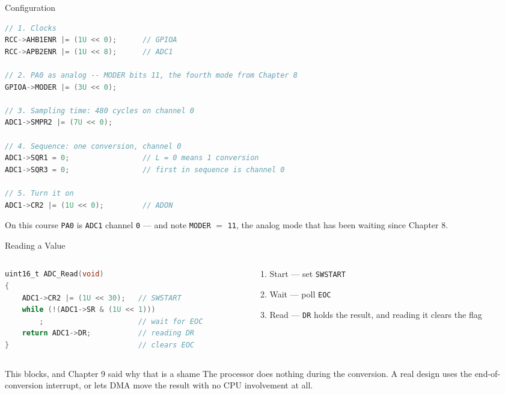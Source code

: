\documentclass[9pt,aspectratio=169,xcolor=table]{beamer}
\begin{document}
\begin{frame}[fragile]{Configuration}
\begin{lstlisting}[language=C, basicstyle=\ttfamily\scriptsize]
// 1. Clocks
RCC->AHB1ENR |= (1U << 0);      // GPIOA
RCC->APB2ENR |= (1U << 8);      // ADC1

// 2. PA0 as analog -- MODER bits 11, the fourth mode from Chapter 8
GPIOA->MODER |= (3U << 0);

// 3. Sampling time: 480 cycles on channel 0
ADC1->SMPR2 |= (7U << 0);

// 4. Sequence: one conversion, channel 0
ADC1->SQR1 = 0;                 // L = 0 means 1 conversion
ADC1->SQR3 = 0;                 // first in sequence is channel 0

// 5. Turn it on
ADC1->CR2 |= (1U << 0);         // ADON
\end{lstlisting}

    \vspace{1mm}
    {\small On this course \texttt{PA0} is \texttt{ADC1} channel \texttt{0} ---
    and note \texttt{MODER} $=$ \texttt{11}, the analog mode that has been waiting
    since Chapter 8.}
\end{frame}

\begin{frame}[fragile]{Reading a Value}
    \begin{columns}[T]
    \begin{column}{.52\textwidth}
\begin{lstlisting}[language=C, basicstyle=\ttfamily\scriptsize]
uint16_t ADC_Read(void)
{
    ADC1->CR2 |= (1U << 30);   // SWSTART
    while (!(ADC1->SR & (1U << 1)))
        ;                      // wait for EOC
    return ADC1->DR;           // reading DR
}                              // clears EOC
\end{lstlisting}
    \end{column}
    \begin{column}{.44\textwidth}
        \begin{enumerate}
            \item \alert{Start} --- set \texttt{SWSTART}
            \item \alert{Wait} --- poll \texttt{EOC}
            \item \alert{Read} --- \texttt{DR} holds the result, and reading it
                  clears the flag
        \end{enumerate}
    \end{column}
    \end{columns}

    \vspace{3mm}
    \begin{block}{This blocks, and Chapter 9 said why that is a shame}
        The processor does nothing during the conversion. A real design uses the
        \alert{end-of-conversion interrupt}, or lets \alert{DMA} move the result
        with no CPU involvement at all.
    \end{block}
\end{frame}
\end{document}
